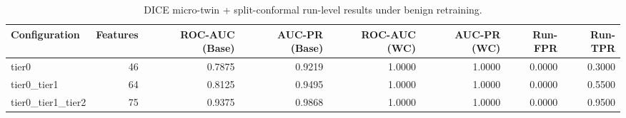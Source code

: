 \begin{table}[t]
\centering
\caption{DICE micro-twin + split-conformal run-level results under benign retraining.}
\label{tab:dice_full_overall}
\footnotesize
\begin{tabular}{lrrrrrrr}
\toprule
Configuration & Features & ROC-AUC (Base) & AUC-PR (Base) & ROC-AUC (WC) & AUC-PR (WC) & Run-FPR & Run-TPR \\
\midrule
tier0 & 46 & 0.7875 & 0.9219 & 1.0000 & 1.0000 & 0.0000 & 0.3000 \\
tier0_tier1 & 64 & 0.8125 & 0.9495 & 1.0000 & 1.0000 & 0.0000 & 0.5500 \\
tier0_tier1_tier2 & 75 & 0.9375 & 0.9868 & 1.0000 & 1.0000 & 0.0000 & 0.9500 \\
\bottomrule
\end{tabular}

\end{table}
